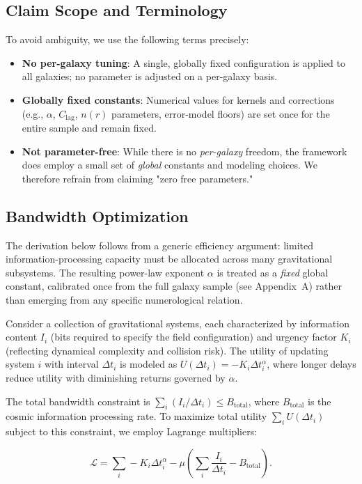 \documentclass[12pt,a4paper]{article}
\begin{document}
\subsection*{Claim Scope and Terminology}
\noindent To avoid ambiguity, we use the following terms precisely:
\begin{itemize}
  \item \textbf{No per-galaxy tuning}: A single, globally fixed configuration is applied to all galaxies; no parameter is adjusted on a per-galaxy basis.
  \item \textbf{Globally fixed constants}: Numerical values for kernels and corrections (e.g., $\alpha$, $C_\mathrm{lag}$, $n(r)$ parameters, error-model floors) are set once for the entire sample and remain fixed.
  \item \textbf{Not parameter-free}: While there is no \emph{per-galaxy} freedom, the framework does employ a small set of \emph{global} constants and modeling choices. We therefore refrain from claiming "zero free parameters."
\end{itemize}

\subsection{Bandwidth Optimization}

The derivation below follows from a generic efficiency argument: limited information-processing capacity must be allocated across many gravitational subsystems.  The resulting power-law exponent $\alpha$ is treated as a \emph{fixed} global constant, calibrated once from the full galaxy sample (see Appendix~A) rather than emerging from any specific numerological relation.

Consider a collection of gravitational systems, each characterized by information content $I_i$ (bits required to specify the field configuration) and urgency factor $K_i$ (reflecting dynamical complexity and collision risk). The utility of updating system $i$ with interval $\Delta t_i$ is modeled as $U(\Delta t_i) = -K_i \Delta t_i^\alpha$, where longer delays reduce utility with diminishing returns governed by $\alpha$.

The total bandwidth constraint is $\sum_i (I_i / \Delta t_i) \leq B_\mathrm{total}$, where $B_\mathrm{total}$ is the cosmic information processing rate. To maximize total utility $\sum_i U(\Delta t_i)$ subject to this constraint, we employ Lagrange multipliers:

\begin{equation}
\mathcal{L} = \sum_i -K_i \Delta t_i^\alpha - \mu \left( \sum_i \frac{I_i}{\Delta t_i} - B_\mathrm{total} \right).
\end{equation}
\end{document}

